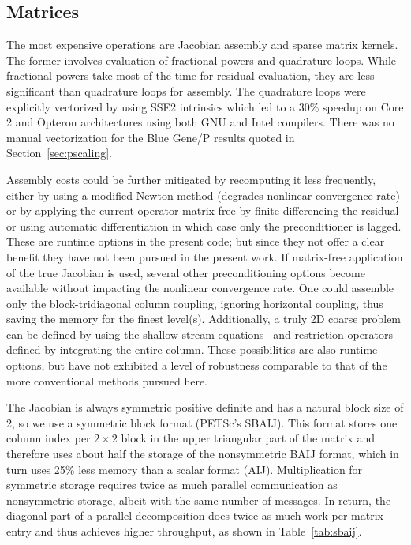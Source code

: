 \documentclass[3p]{elsarticle}
\begin{document}
\subsection{Matrices}
The most expensive operations are Jacobian assembly and sparse matrix kernels.  The former involves evaluation of fractional powers and quadrature loops.  While fractional powers take most of the time for residual evaluation, they are less significant than quadrature loops for assembly.  The quadrature loops were explicitly vectorized by using SSE2 intrinsics which led to a 30\% speedup on Core 2 and Opteron architectures using both GNU and Intel compilers.  There was no manual vectorization for the Blue Gene/P results quoted in Section~\ref{sec:pscaling}.

Assembly costs could be further mitigated by recomputing it less frequently, either by using a modified Newton method (degrades nonlinear convergence rate) or by applying the current operator matrix-free by finite differencing the residual or using automatic differentiation in which case only the preconditioner is lagged.  These are runtime options in the present code; but since they not offer a clear benefit they have not been pursued in the present work.  If matrix-free application of the true Jacobian is used, several other preconditioning options become available without impacting the nonlinear convergence rate.  One could assemble only the block-tridiagonal column coupling, ignoring horizontal coupling, thus saving the memory for the finest level(s). Additionally, a truly 2D coarse problem can be defined by using the shallow stream equations~\cite{morland1987unconfined,weis1999theory,schoof2006variational} and restriction operators defined by integrating the entire column.  These possibilities are also runtime options, but have not exhibited a level of robustness comparable to that of the more conventional methods pursued here.

The Jacobian is always symmetric positive definite and has a natural block size of 2, so we use a symmetric block format (PETSc's SBAIJ).  This format stores one column index per $2\times 2$ block in the upper triangular part of the matrix and therefore uses about half the storage of the nonsymmetric BAIJ format, which in turn uses 25\% less memory than a scalar format (AIJ). Multiplication for symmetric storage requires twice as much parallel communication as nonsymmetric storage, albeit with the same number of messages. In return, the diagonal part of a parallel decomposition does twice as much work per matrix entry and thus achieves higher throughput, as shown in Table~\ref{tab:sbaij}.
\end{document}

